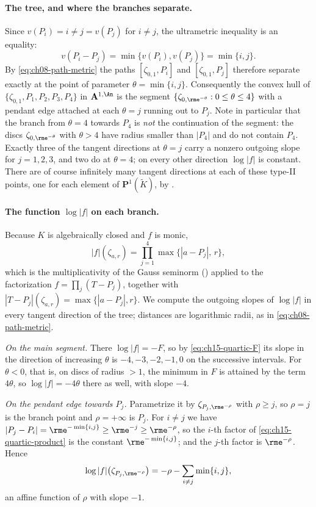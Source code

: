 \paragraph{The tree, and where the branches separate.}
Since $v(P_i)=i\neq j=v(P_j)$ for $i\neq j$, the ultrametric inequality is an
equality:
\[
 v(P_i-P_j)=\min\{v(P_i),v(P_j)\}=\min\{i,j\}.
\]
By \eqref{eq:ch08-path-metric} the paths $[\zeta_{0,1},P_i]$ and
$[\zeta_{0,1},P_j]$ therefore separate exactly at the point of parameter
$\theta=\min\{i,j\}$.  Consequently the convex hull of
$\{\zeta_{0,1},P_1,P_2,P_3,P_4\}$ in $\mathbf A^{1,\An}$ is the segment
$\{\zeta_{0,\rme^{-\theta}}:0\le\theta\le4\}$ with a pendant edge attached at
each $\theta=j$ running out to $P_j$.  Note in particular that the branch
from $\theta=4$ towards $P_4$ is \emph{not} the continuation of the segment:
the discs $\zeta_{0,\rme^{-\theta}}$ with $\theta>4$ have radius smaller than
$|P_4|$ and do not contain $P_4$.  Exactly three of the tangent directions at $\theta=j$ carry a nonzero
outgoing slope for $j=1,2,3$, and two do at $\theta=4$; on every other
direction $\log|f|$ is constant.  There are of course infinitely many
tangent directions at each of these type-II points, one for each element of
$\mathbf P^1(\widetilde K)$, by .

\paragraph{The function $\log|f|$ on each branch.}
Because $K$ is algebraically closed and $f$ is monic,
\begin{equation}
\label{eq:ch15-quartic-product}
 |f|(\zeta_{a,r})=\prod_{j=1}^4\max\{|a-P_j|,\,r\},
\end{equation}
which is the multiplicativity of the Gauss seminorm
() applied to the factorization
$f=\prod_j(T-P_j)$, together with
$|T-P_j|(\zeta_{a,r})=\max\{|a-P_j|,r\}$.  We compute the outgoing slopes of
$\log|f|$ in every tangent direction of the tree; distances are logarithmic
radii, as in \eqref{eq:ch08-path-metric}.

\emph{On the main segment.}  There $\log|f|=-F$, so by
\eqref{eq:ch15-quartic-F} its slope in the direction of increasing $\theta$ is
$-4,-3,-2,-1,0$ on the successive intervals.  For $\theta<0$, that is, on
discs of radius $>1$, the minimum in $F$ is attained by the term $4\theta$,
so $\log|f|=-4\theta$ there as well, with slope $-4$.

\emph{On the pendant edge towards $P_j$.}  Parametrize it by
$\zeta_{P_j,\rme^{-\rho}}$ with $\rho\ge j$, so $\rho=j$ is the branch point
and $\rho=+\infty$ is $P_j$.  For $i\neq j$ we have
$|P_j-P_i|=\rme^{-\min\{i,j\}}\ge\rme^{-j}\ge\rme^{-\rho}$, so the $i$-th
factor of \eqref{eq:ch15-quartic-product} is the constant
$\rme^{-\min\{i,j\}}$; and the $j$-th factor is $\rme^{-\rho}$.  Hence
\[
 \log|f|\bigl(\zeta_{P_j,\rme^{-\rho}}\bigr)
 =-\rho-\sum_{i\neq j}\min\{i,j\},
\]
an affine function of $\rho$ with slope $-1$.


